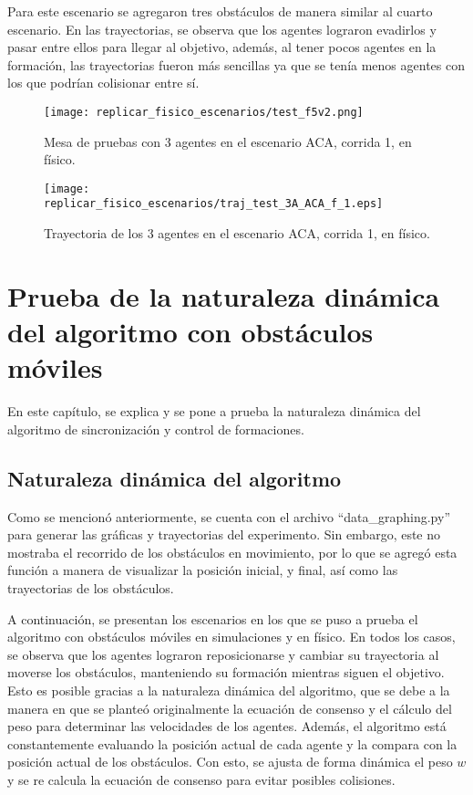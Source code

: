 Para este escenario se agregaron tres obstáculos de manera similar al cuarto escenario. En las trayectorias, se observa que los agentes lograron evadirlos y pasar entre ellos para llegar al objetivo, además, al tener pocos agentes en la formación, las trayectorias fueron más sencillas ya que se tenía menos agentes con los que podrían colisionar entre sí.

\begin{figure}[H]
	\centering
	\texttt{[image: replicar\_fisico\_escenarios/test\_f5v2.png]}
	\caption{Mesa de pruebas con 3 agentes en el escenario ACA, corrida 1, en físico.}
	\label{fig:test_fisico5}
\end{figure}
\begin{figure}[H]
	\centering
	\texttt{[image: replicar\_fisico\_escenarios/traj\_test\_3A\_ACA\_f\_1.eps]}
	\caption{Trayectoria de los 3 agentes en el escenario ACA, corrida 1, en físico.}
	\label{fig:traj_test_3A_ACA_f_1}
\end{figure}

\chapter{Prueba de la naturaleza dinámica del algoritmo con obstáculos móviles}\label{cap:naturaleta_dinamica}
En este capítulo, se explica y se pone a prueba la naturaleza dinámica del algoritmo de sincronización y control de formaciones. 

\section{Naturaleza dinámica del algoritmo}
Como se mencionó anteriormente, se cuenta con el archivo ``data\_graphing.py'' para generar las gráficas y trayectorias del experimento. Sin embargo, este no mostraba el recorrido de los obstáculos en movimiento, por lo que se agregó esta función a manera de visualizar la posición inicial, y final, así como las trayectorias de los obstáculos.

A continuación, se presentan los escenarios en los que se puso a prueba el algoritmo con obstáculos móviles en simulaciones y en físico. En todos los casos, se observa que los agentes lograron reposicionarse y cambiar su trayectoria al moverse los obstáculos, manteniendo su formación mientras siguen el objetivo. Esto es posible gracias a la naturaleza dinámica del algoritmo, que se debe a la manera en que se planteó originalmente la ecuación de consenso y el cálculo del peso para determinar las velocidades de los agentes. Además, el algoritmo está constantemente evaluando la posición actual de cada agente y la compara con la posición actual de los obstáculos. Con esto, se ajusta de forma dinámica el peso $w$ y se re calcula la ecuación de consenso para evitar posibles colisiones.


